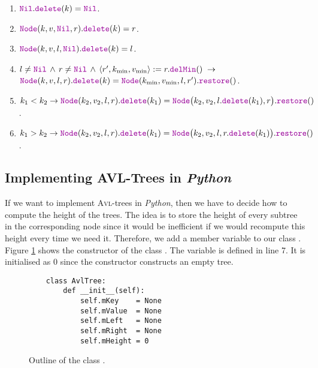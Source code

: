 \begin{enumerate}
\item $\mytt{Nil}.\mytt{delete}(k) = \mytt{Nil}$.
\item $\mytt{Node}(k,v,\mytt{Nil},r).\mytt{delete}(k) = r$.
\item $\mytt{Node}(k,v,l,\mytt{Nil}).\mytt{delete}(k) = l$.
\item $l \not= \mytt{Nil} \,\wedge\, r \not= \mytt{Nil} \,\wedge\, 
       \langle r',k_{\textrm{min}}, v_{\textrm{min}} \rangle := r.\mytt{delMin}()  \;\rightarrow$ \\[0.2cm]
      \hspace*{1.3cm}
      $\mytt{Node}(k,v,l,r).\mytt{delete}(k) = \mytt{Node}(k_{\textrm{min}},v_{\textrm{min}},l,r').\mytt{restore}()$.
\item $k_1 < k_2 \rightarrow \mytt{Node}(k_2,v_2,l,r).\mytt{delete}(k_1) = 
       \mytt{Node}\bigl(k_2,v_2,l.\mytt{delete}(k_1),r\bigr).\mytt{restore}()$.
\item $k_1 > k_2 \rightarrow \mytt{Node}(k_2,v_2,l,r).\mytt{delete}(k_1) = 
         \mytt{Node}\bigl(k_2,v_2,l,r.\mytt{delete}(k_1)\bigr).\mytt{restore}()$.
\end{enumerate}


\subsection{Implementing AVL-Trees in \textsl{Python}}
If we want to implement \textsc{Avl}-trees in \textsl{Python}, then we have to decide how to compute the height
of the trees.  The idea is to store the height of every subtree in the corresponding node since it
would be inefficient if we would recompute this height every time we need it.  Therefore, we add a
member variable  to our class .
Figure \ref{fig:avl-tree.ipython:init} shows the constructor of the class .  The variable
 is defined in line 7.  It is initialised as $0$ since the constructor 
constructs an empty tree.  

\begin{figure}[!ht]
  \centering
\begin{verbatim}
    class AvlTree:
        def __init__(self):
            self.mKey    = None
            self.mValue  = None
            self.mLeft   = None
            self.mRight  = None
            self.mHeight = 0 
\end{verbatim}
\vspace*{-0.3cm}
  \caption{Outline of the class .}
  \label{fig:avl-tree.ipython:init}
\end{figure}

